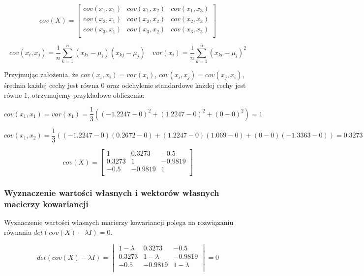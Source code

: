 \documentclass{article}
\begin{document}
\begin{equation}
    cov(X) = \begin{bmatrix}
        cov(x_1, x_1) & cov(x_1, x_2) & cov(x_1, x_3) \\
        cov(x_2, x_1) & cov(x_2, x_2) & cov(x_2, x_3) \\
        cov(x_3, x_1) & cov(x_3, x_2) & cov(x_3, x_3) \\
    \end{bmatrix}
\end{equation}

\begin{equation}
    cov(x_i, x_j) = \frac{1}{n} \sum_{k=1}^{n} (x_{ki} - \mu_i)(x_{kj} - \mu_j) \quad
    var(x_i) = \frac{1}{n} \sum_{k=1}^{n} (x_{ki} - \mu_i)^2
\end{equation}

Przyjmując założenia, że $cov(x_i, x_i) = var(x_i)$, $cov(x_i, x_j) = cov(x_j, x_i)$,
średnia każdej cechy jest równa $0$ oraz odchylenie standardowe każdej cechy jest równe $1$,
otrzymujemy przykładowe obliczenia:

\begin{equation*}
    cov(x_1, x_1) = var(x_1) = \frac{1}{3} ((-1.2247 - 0)^2 + (1.2247 - 0)^2 + (0 - 0)^2) = 1
\end{equation*}

\begin{equation*}
    cov(x_1, x_2) = \frac{1}{3} ((-1.2247 - 0)(0.2672 - 0) + (1.2247 - 0)(1.069 - 0) + (0 - 0)(-1.3363 - 0)) = 0.3273
\end{equation*}

\begin{equation}
    cov(X) = 
    \begin{bmatrix}
        1 & 0.3273 & -0.5 \\
        0.3273 & 1 & -0.9819 \\
        -0.5 & -0.9819 & 1 \\
    \end{bmatrix}
\end{equation}

\subsubsection*{Wyznaczenie wartości własnych i wektorów własnych macierzy kowariancji}

Wyznaczenie wartości własnych macierzy kowariancji
polega na rozwiązaniu równania $det(cov(X) - \lambda I) = 0$.

\begin{equation}
    det(cov(X) - \lambda I) = 
    \begin{vmatrix}
        1 - \lambda & 0.3273 & -0.5 \\
        0.3273 & 1 - \lambda & -0.9819 \\
        -0.5 & -0.9819 & 1 - \lambda \\
    \end{vmatrix} = 0
\end{equation}
\end{document}
